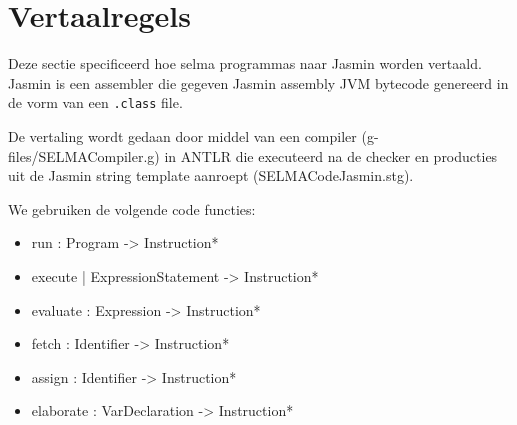 \documentclass[]{article}
\begin{document}
%
%
%


\newpage
\section{Vertaalregels}
Deze sectie specificeerd hoe selma programmas naar Jasmin worden vertaald. Jasmin is een assembler die gegeven Jasmin assembly JVM bytecode genereerd in de vorm van een \texttt{.class} file.

De vertaling wordt gedaan door middel van een compiler (g-files/SELMACompiler.g) in ANTLR die executeerd na de checker en producties uit de Jasmin string template aanroept (SELMACodeJasmin.stg).

We gebruiken de volgende code functies:

\begin{itemize}
	\item run       : Program     -> Instruction*
	\item execute   | ExpressionStatement -> Instruction*
 	\item evaluate  : Expression  -> Instruction*
 	\item fetch		  : Identifier  -> Instruction*
 	\item assign    : Identifier   -> Instruction*
 	\item elaborate : VarDeclaration -> Instruction*
\end{itemize}
\end{document}
